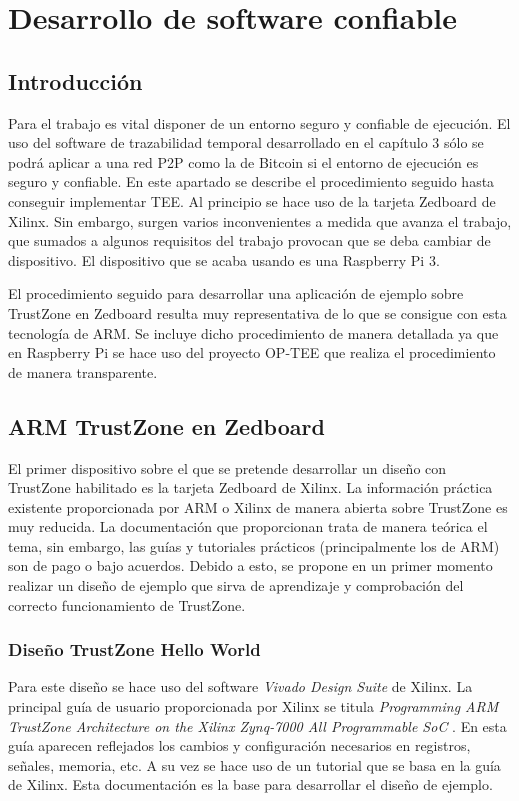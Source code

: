 \chapter{Desarrollo de software confiable}

\section{Introducción}
Para el trabajo es vital disponer de un entorno seguro y confiable de ejecución. El uso del software de trazabilidad temporal desarrollado en el capítulo 3 sólo se podrá aplicar a una red P2P como la de Bitcoin si el entorno de ejecución es seguro y confiable. En este apartado se describe el procedimiento seguido hasta conseguir implementar TEE. Al principio se hace uso de la tarjeta Zedboard de Xilinx. Sin embargo, surgen varios inconvenientes a medida que avanza el trabajo, que sumados a algunos requisitos del trabajo provocan que se deba cambiar de dispositivo. El dispositivo que se acaba usando es una Raspberry Pi 3. \newline

El procedimiento seguido para desarrollar una aplicación de ejemplo sobre TrustZone en Zedboard resulta muy representativa de lo que se consigue con esta tecnología de ARM. Se incluye dicho procedimiento de manera detallada ya que en Raspberry Pi se hace uso del proyecto OP-TEE que realiza el procedimiento de manera transparente.

\section{ARM TrustZone en Zedboard}

El primer dispositivo sobre el que se pretende desarrollar un diseño con TrustZone habilitado es la tarjeta Zedboard de Xilinx. La información práctica existente proporcionada por ARM o Xilinx de manera abierta sobre TrustZone es muy reducida. La documentación que proporcionan trata de manera teórica el tema, sin embargo, las guías y tutoriales prácticos (principalmente los de ARM) son de pago o bajo acuerdos. Debido a esto, se propone en un primer momento realizar un diseño de ejemplo que sirva de aprendizaje y comprobación del correcto funcionamiento de TrustZone.

\subsection{Diseño TrustZone Hello World}
Para este diseño se hace uso del software \textit{Vivado Design Suite} de Xilinx. La principal guía de usuario proporcionada por Xilinx se titula \textit{Programming ARM TrustZone Architecture on the Xilinx Zynq-7000 All Programmable SoC} \cite{guiaxilinx}. En esta guía aparecen reflejados los cambios y configuración necesarios en registros, señales, memoria, etc. A su vez se hace uso de un tutorial \cite{vivadotutorial} que se basa en la guía de Xilinx. Esta documentación es la base para desarrollar el diseño de ejemplo.\newline

